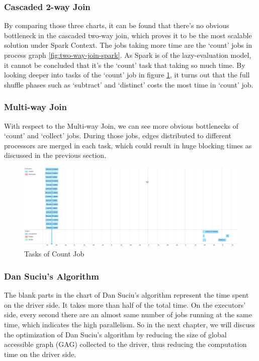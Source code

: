 \subsubsection{Cascaded 2-way Join}
By comparing those three charts, it can be found that there's no obvious bottleneck in the cascaded two-way join, which proves it to be the most scalable solution under Spark Context. The jobs taking more time are the `count' jobs in process graph \ref{fig:two-way-join-spark}. As Spark is of the lazy-evaluation model, it cannot be concluded that it's the `count'  task that taking so much time. By looking deeper into tasks of the `count' job in figure \ref{fig:alibaba-two-tasks}, it turns out that the full shuffle phases such as `subtract' and `distinct' costs the most time in `count' job. 
\subsubsection{Multi-way Join}
With respect to the Multi-way Join, we can see more obvious bottlenecks of `count' and `collect' jobs. During those jobs, edges distributed to different processors are merged in each task, which could result in huge blocking times as discussed in the previous section.
\begin{figure}[h!]
  \caption{Tasks of Count Job}
  \label{fig:alibaba-two-tasks}
  \centering
    \includegraphics[width=1.0\textwidth]{img/alibaba-two-tasks}
\end{figure}
\subsubsection{Dan Suciu's Algorithm}
The blank parts in the chart of Dan Suciu's algorithm represent the time spent on the driver side. It takes more than half of the total time. On the executors' side, every second there are an almost same number of jobs running at the same time, which indicates the high parallelism. So in the next chapter, we will discuss the optimization of Dan Suciu's algorithm by reducing the size of global accessible graph (GAG) collected to the driver, thus reducing the computation time on the driver side.

